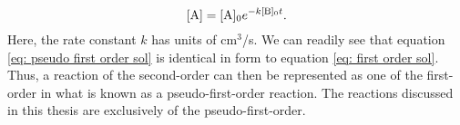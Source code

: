 \begin{equation}
	\ce{[A]} = \ce{[A]0}e^{-k\ce{[B]0}t}. \label{eq: pseudo first order sol}
\end{equation}
Here, the rate constant $k$ has units of cm$^3$/s. We can readily see that equation \ref{eq: pseudo first order sol} is identical in form to equation \ref{eq: first order sol}. Thus, a reaction of the second-order can then be represented as one of the first-order in what is known as a pseudo-first-order reaction. The reactions discussed in this thesis are exclusively of the pseudo-first-order.